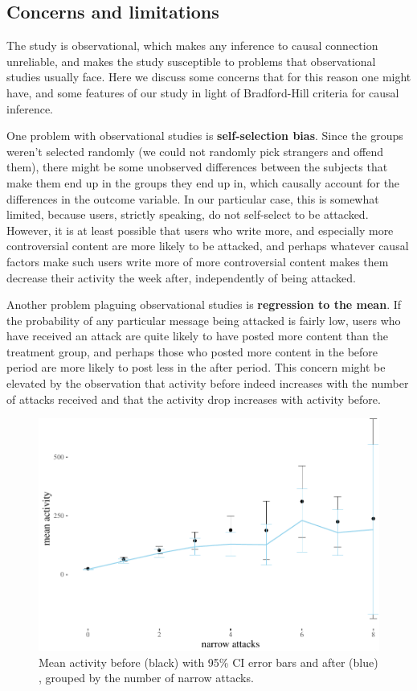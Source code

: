 \documentclass[a4paper,fleqn]{cas-dc}
\begin{document}
\subsection{Concerns and limitations}

The study is observational, which makes any inference to causal
connection unreliable, and makes the study susceptible to problems that
observational studies usually face. Here we discuss some concerns that
for this reason one might have, and some features of our study in light
of Bradford-Hill criteria for causal inference.

One problem with observational studies is \textbf{self-selection bias}.
Since the groups weren't selected randomly (we could not randomly pick
strangers and offend them), there might be some unobserved differences
between the subjects that make them end up in the groups they end up in,
which causally account for the differences in the outcome variable. In
our particular case, this is somewhat limited, because users, strictly
speaking, do not self-select to be attacked. However, it is at least
possible that users who write more, and especially more controversial content
are more likely to be attacked, and perhaps whatever causal factors make
such users write more of more controversial content makes them decrease
their activity the week after, independently of being attacked.

Another problem plaguing observational studies is
\textbf{regression to the mean}. If the probability of any particular
message being attacked is fairly low, users who have received an attack
are quite likely to have posted more content than the treatment group,
and perhaps those who posted more content in the \textsf{before} period
are more likely to post less in the \textsf{after} period. This concern
might be elevated by the observation that activity before indeed
increases with the number of attacks received and that the activity drop
increases with \textsf{activity} before.

\begin{figure}
\begin{center}\includegraphics[width=1\linewidth]{images/unnamed-chunk-59-1} \end{center}
\caption{Mean activity before (black) with 95\% CI error bars and after (blue) , grouped by the number of narrow attacks.}
\end{figure}
\end{document}
